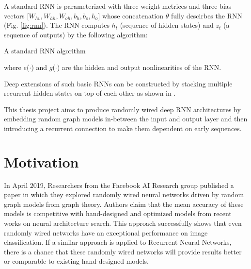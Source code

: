 \documentclass[acmlarge,screen,natbib=false]{acmart}
\begin{document}
A standard RNN is parameterized with three weight metrices and three bias vectors [$W_{hv}, W_{hh}, W_{oh}, b_{h}, b_{o}, h_{o}$] whose concatenation $\theta$ fully descirbes the RNN (Fig. \ref{fig:rnn}). The RNN computes $h_{t}$ (sequence of hidden states) and $z_{t}$ (a sequence of outputs) by the following algorithm:

\begin{algorithm}
  \caption{A standard RNN algorithm \cite{is-phd-thesis}}\label{std_rnn}
  \begin{algorithmic}[1]
    \EndFor
  \end{algorithmic}
\end{algorithm}
where $e$($\cdot$) and $g$($\cdot$) are the hidden and output nonlinearities of the RNN.

Deep extensions of such basic RNNs can be constructed by stacking multiple recurrent hidden states on top of each other as shown in \cite{drnn-2013}.

This thesis project aims to produce randomly wired deep RNN architectures by embedding random graph models in-between the input and output layer and then introducing a recurrent connection to make them dependent on early sequences.

\section{Motivation}
In April 2019, Researchers from the Facebook AI Research group published a paper \cite{randnn} in which they explored randomly wired neural networks driven by random graph models from graph theory. Authors claim that the mean accuracy of these models is competitive with hand-designed and optimized models from recent works on neural architecture search. This approach successfully shows that even randomly wired networks have an exceptional performance on image classification. If a similar approach is applied to Recurrent Neural Networks, there is a chance that these randomly wired networks will provide results better or comparable to existing hand-designed models.
\end{document}
